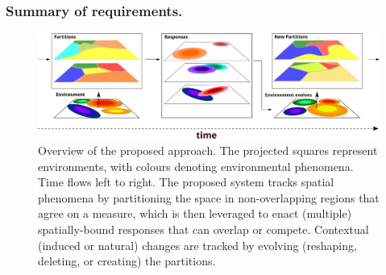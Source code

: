 \subsubsection{Summary of requirements.}
\begin{figure}
  \centering
  \includegraphics[width=\linewidth]{papers/ieee2022/img/approach-images/action-with-multilayer.pdf}
  \caption[Overview of the dynamic decentralization domains approach]{
    Overview of the proposed approach.
    The projected squares represent environments,
    with colours denoting environmental phenomena. %
    Time flows left to right.
    The proposed system tracks spatial phenomena
    by partitioning the space in non-overlapping regions that agree on a measure,
    which is then leveraged to enact (multiple) spatially-bound responses
    that can %
    overlap or compete.
    Contextual (induced or natural) changes
    are tracked by evolving (reshaping, deleting, or creating) the partitions.
  }
  \label{fig:high-level-description}
\end{figure}


